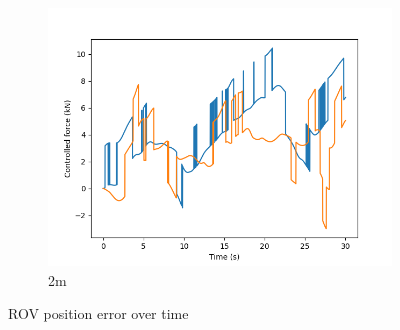 \documentclass[class=article, crop=false]{standalone}
\begin{document}
\begin{figure}
\begin{subfigure}[b]{0.48\textwidth}
        \includegraphics{scenario1/rov-100m/2.0m/usv_forces}
        \caption{2m}
        \label{}
    \end{subfigure}

    \caption{ROV position error over time}
\end{figure}
\end{document}
